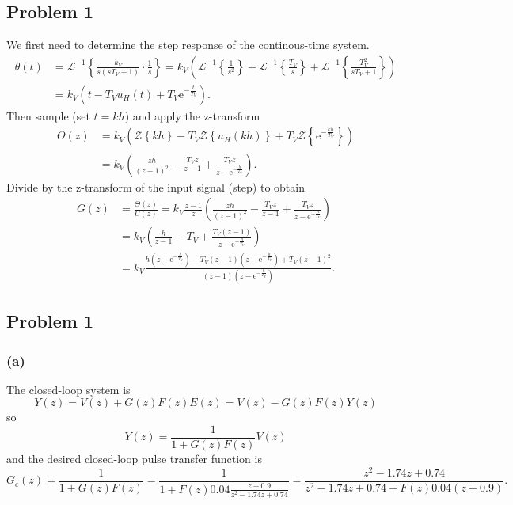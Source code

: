 \documentclass[letterpaper,12pt]{scrartcl}
\newcommand{\mexp}[1]{\ensuremath{\mathrm{e}^{#1}}}
\newcommand*{\laplaceinv}[1]{\ensuremath{\mathcal{L}^{-1} \left\{#1\right\}}}
\newcommand*{\ztrf}[1]{\ensuremath{\mathcal{Z} \left\{#1\right\}}}
\begin{document}
\subsection*{Problem 1}
We first need to determine the step response of the continous-time system.
\begin{equation*}
\begin{split}
 \theta(t) &= \laplaceinv{\frac{k_V}{s(sT_V+1)} \cdot \frac{1}{s}} = k_V \left( \laplaceinv{\frac{1}{s^2}} - \laplaceinv{\frac{T_V}{s}} + \laplaceinv{\frac{T_V^2}{sT_V + 1}} \right)\\
 &= k_V \left( t - T_Vu_H(t) + T_V\mexp{-\frac{t}{T_V}}\right).
\end{split}
\end{equation*}
Then sample (set $t=kh$) and apply the z-transform
\begin{equation*}
\begin{split}
\Theta(z) &= k_V \left( \ztrf{kh} -T_V\ztrf{u_H(kh)} + T_V\ztrf{\mexp{-\frac{kh}{T_V}}} \right)\\
&= k_V \left( \frac{zh}{(z-1)^2} - \frac{T_V z}{z-1} + \frac{T_V z}{z - \mexp{-\frac{h}{T_V}}} \right).
\end{split}
\end{equation*}
Divide by the z-transform of the input signal (step) to obtain
\begin{equation*}
\begin{split}
  G(z) &= \frac{\Theta(z)}{U(z)} = k_V\frac{z-1}{z} \left ( \frac{zh}{(z-1)^2} - \frac{T_V z}{z-1} + \frac{T_V z}{z - \mexp{-\frac{h}{T_V}}} \right)\\
&= k_V\left( \frac{h}{z-1} - T_V + \frac{T_V(z-1)}{z - \mexp{-\frac{h}{T_V}}} \right)\\
&= k_V \frac{h(z-\mexp{-\frac{h}{T_V}}) - T_V(z-1)(z-\mexp{-\frac{h}{T_V}}) + T_V(z-1)^2}{(z-1)(z-\mexp{-\frac{h}{T_V}})}.
\end{split}
\end{equation*}

\subsection*{Problem 1}
\subsubsection*{(a)}
The closed-loop system is
\[ Y(z) = V(z) + G(z)F(z)E(z) = V(z) - G(z)F(z)Y(z) \]
so
\[ Y(z) = \frac{1}{1 + G(z)F(z)} V(z)\]
and the desired closed-loop pulse transfer function is
\[ G_c(z) = \frac{1}{1 + G(z)F(z)} = \frac{1}{1 + F(z)0.04\frac{z+0.9}{z^2 - 1.74z + 0.74}}
          = \frac{z^2 - 1.74z + 0.74}{z^2 - 1.74z + 0.74 + F(z)0.04(z+0.9)}. \]
\end{document}
